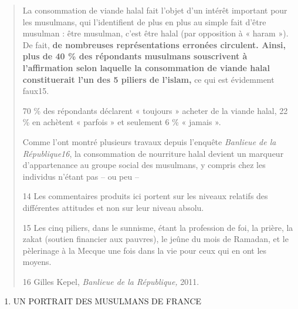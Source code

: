 \begin{quote}
La consommation de viande halal fait l'objet d'un intérêt important pour
les musulmans, qui l'identifient de plus en plus au simple fait d'être
musulman : être musulman, c'est être halal (par opposition à « haram »).
De fait, \textbf{de nombreuses représentations erronées circulent.
Ainsi, plus de 40 \% des répondants musulmans souscrivent à
l'affirmation selon laquelle la consommation de viande halal
constituerait l'un des 5 piliers de l'islam,} ce qui est évidemment
faux15.

70 \% des répondants déclarent « toujours » acheter de la viande halal,
22 \% en achètent « parfois » et seulement 6 \% « jamais ».

Comme l'ont montré plusieurs travaux depuis l'enquête \emph{Banlieue de
la République16}, la consommation de nourriture halal devient un
marqueur d'appartenance au groupe social des musulmans, y compris chez
les individus n'étant pas -- ou peu --

14 Les commentaires produits ici portent sur les niveaux relatifs des
différentes attitudes et non sur leur niveau absolu.

15 Les cinq piliers, dans le sunnisme, étant la profession de foi, la
prière, la zakat (soutien financier aux pauvres), le jeûne du mois de
Ramadan, et le pèlerinage à la Mecque une fois dans la vie pour ceux qui
en ont les moyens.

16 Gilles Kepel, \emph{Banlieue de la République,} 2011.
\end{quote}

\begin{enumerate}
\def\labelenumi{\Roman{enumi}.}
\item
  UN PORTRAIT DES MUSULMANS DE FRANCE
\end{enumerate}

